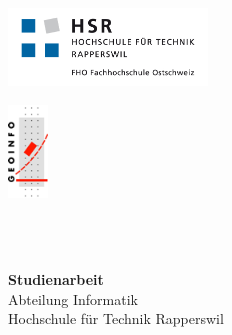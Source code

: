 \begin{titlepage}
\begin{flushleft}

\noindent\begin{minipage}[t]{0.49\textwidth}
	\begin{flushleft}
		\vspace{0pt} %
		\includegraphics[width=200px]{./images/logo-hsr.jpg}
	\end{flushleft}
\end{minipage}
\hfill
\begin{minipage}[t]{0.49\textwidth}
	\begin{flushright}
		\vspace{0pt} %
		\includegraphics[width=40px]{./images/logo-geoinfo.png}
	\end{flushright}
\end{minipage}
\\[1.5cm]

\\[1.5cm]

\begin{center}
{\Large \bfseries Studienarbeit}\\[0.5cm]
{\Large
	Abteilung Informatik \\[0.2cm]
	Hochschule für Technik Rapperswil
}\\[1.5cm]
\end{center}

\\[1.5cm]


\end{flushleft}
\end{titlepage}

